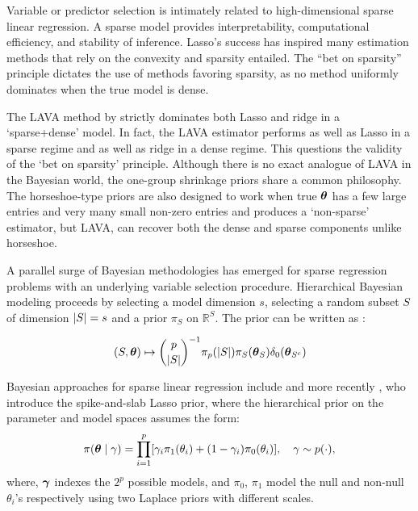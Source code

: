 \documentclass[sts,preprint]{imsart}
\begin{document}
Variable or predictor selection is intimately related to high-dimensional sparse linear regression.  A sparse model provides interpretability, computational efficiency, and stability of inference. Lasso's success has inspired many estimation methods that rely on the convexity and sparsity entailed. The ``bet on sparsity'' principle \citep{hastie_elements_2009} dictates the use of methods favoring sparsity, as no method uniformly dominates when the true model is dense.  

\begin{remark}

The LAVA method by \citet{chernozhukov2017lava} strictly dominates both Lasso and ridge in a `sparse+dense' model. In fact, the LAVA estimator performs as well as Lasso in a sparse regime and as well as ridge \citep{tikhonov1963solution} in a dense regime. This questions the validity of the `bet on sparsity' principle. 
Although there is no exact analogue of LAVA in the Bayesian world, the one-group shrinkage priors share a common philosophy. The horseshoe-type priors are also designed to work when true $\boldsymbol{\theta}$ has a few large entries and very many small non-zero entries and produces a `non-sparse' estimator, but LAVA, can recover both the dense and sparse components unlike horseshoe.

\end{remark}

A parallel surge of Bayesian methodologies has emerged for sparse regression problems with an underlying variable selection procedure. Hierarchical Bayesian modeling proceeds by selecting a model dimension $s$, selecting a random subset $S$ of dimension $\lvert S\rvert = s$ and a prior $\pi_S$ on $\mathbb{R}^{S}$. The prior can be written as \cite{castillo2015bayesian}:

\begin{equation}
  (S,\boldsymbol{\theta}) \mapsto \binom{p}{\lvert S\rvert}^{-1} 
	\pi_p(\lvert S\rvert) \pi_S(\boldsymbol{\theta}_S)\delta_{0}(\boldsymbol{\theta}_{S^c}) \label{eq:bayes-hier}
\end{equation}

\noindent Bayesian approaches for sparse linear regression include \citep{george2000variable, George0000, mitchell88, ishwaran2005spike} and more recently \cite{rovckova2016spike}, who introduce the spike-and-slab Lasso prior, where the hierarchical prior on the parameter and model spaces assumes the form:
\begin{equation}
  \pi(\boldsymbol{\theta} \mid \gamma) = \prod_{i=1}^{p} [\gamma_i \pi_1(\theta_i) +
  (1-\gamma_i) \pi_0(\theta_i)], \quad \gamma \sim p(\cdot), \label{eq:ssl}
\end{equation}
where, $\boldsymbol{\gamma}$ indexes the $2^p$ possible models, and $\pi_0$, $\pi_1$ model the null and non-null $\theta_i$'s respectively using two Laplace priors with different scales. 
\end{document}
